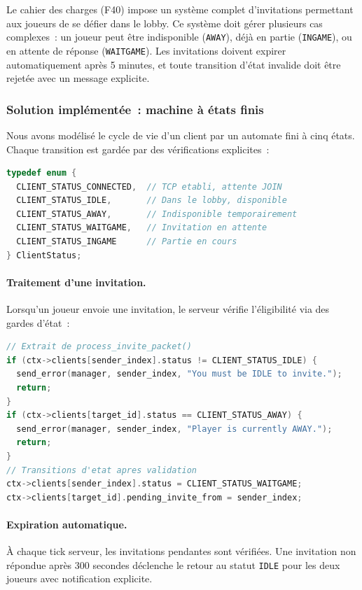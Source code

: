 \documentclass[a4paper]{article}
\begin{document}
Le cahier des charges (F40) impose un système complet d'invitations permettant aux joueurs de se défier dans le lobby. Ce système doit gérer plusieurs cas complexes~: un joueur peut être indisponible (\texttt{AWAY}), déjà en partie (\texttt{INGAME}), ou en attente de réponse (\texttt{WAITGAME}). Les invitations doivent expirer automatiquement après 5 minutes, et toute transition d'état invalide doit être rejetée avec un message explicite.
 
\subsubsection{Solution implémentée~: machine à états finis}
 
Nous avons modélisé le cycle de vie d'un client par un automate fini à cinq états. Chaque transition est gardée par des vérifications explicites~:
 
\begin{lstlisting}[language=C, caption=Énumération des statuts clients]
typedef enum {
  CLIENT_STATUS_CONNECTED,  // TCP etabli, attente JOIN
  CLIENT_STATUS_IDLE,       // Dans le lobby, disponible
  CLIENT_STATUS_AWAY,       // Indisponible temporairement
  CLIENT_STATUS_WAITGAME,   // Invitation en attente
  CLIENT_STATUS_INGAME      // Partie en cours
} ClientStatus;
\end{lstlisting}
 
\paragraph{Traitement d'une invitation.}
Lorsqu'un joueur envoie une invitation, le serveur vérifie l'éligibilité via des gardes d'état~:
 
\begin{lstlisting}[language=C, caption=Gardes de transition pour les invitations]
// Extrait de process_invite_packet()
if (ctx->clients[sender_index].status != CLIENT_STATUS_IDLE) {
  send_error(manager, sender_index, "You must be IDLE to invite.");
  return;
}
if (ctx->clients[target_id].status == CLIENT_STATUS_AWAY) {
  send_error(manager, sender_index, "Player is currently AWAY.");
  return;
}
// Transitions d'etat apres validation
ctx->clients[sender_index].status = CLIENT_STATUS_WAITGAME;
ctx->clients[target_id].pending_invite_from = sender_index;
\end{lstlisting}
 
\paragraph{Expiration automatique.}
À chaque tick serveur, les invitations pendantes sont vérifiées. Une invitation non répondue après 300 secondes déclenche le retour au statut \texttt{IDLE} pour les deux joueurs avec notification explicite.
 
\end{document}

